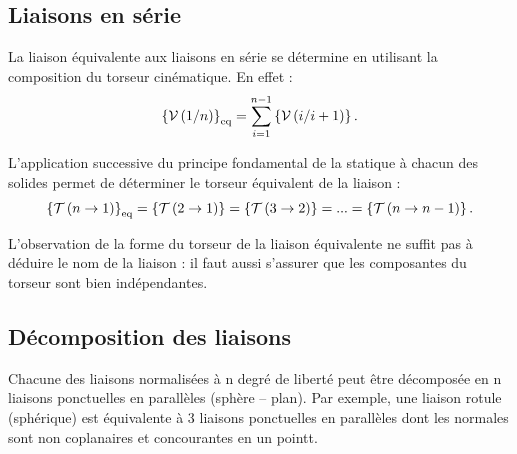 \documentclass[10pt,fleqn]{article} %
\begin{document}
\subsection{Liaisons en série}
\begin{methode}
La liaison équivalente aux liaisons en série se détermine en utilisant la composition du torseur cinématique. En effet : 
$$
\left\{\mathcal{V} \left(1/n \right) \right\}_{\text{eq}} = \sum\limits_{i=1}^{n-1}\left\{\mathcal{V} \left(i/i+1 \right) \right\}.
$$ 
\end{methode}

\begin{rem}
L'application successive du principe fondamental de la statique à chacun des solides permet de déterminer le torseur équivalent de la liaison : 
$$
\left\{\mathcal{T} \left(n\rightarrow 1 \right) \right\}_{\text{eq}} = 
\left\{\mathcal{T} \left(2\rightarrow 1 \right) \right\} = 
\left\{\mathcal{T} \left(3\rightarrow 2 \right) \right\} =
...
=\left\{\mathcal{T} \left(n\rightarrow n-1 \right) \right\}.
$$ 
\end{rem}

\begin{warn}
L'observation de la forme du torseur de la liaison équivalente ne suffit pas à déduire le nom de la liaison : il faut aussi s'assurer que les composantes du torseur sont bien indépendantes. 
\end{warn}

\subsection{Décomposition des liaisons}
Chacune des liaisons normalisées à n degré de liberté peut être décomposée en n liaisons ponctuelles en parallèles (sphère -- plan). Par exemple, une liaison rotule (sphérique) est équivalente à 3 liaisons ponctuelles en parallèles dont les normales sont non coplanaires et concourantes en un pointt.  
\end{document}
